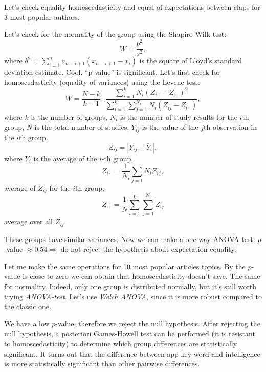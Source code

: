 \documentclass[12pt]{report}
\begin{document}
Let's check equality homoscedasticity and equal of expectations between claps for 3  most popular authors.

Let's check for the normality of the group using the Shapiro-Wilk test:
\[
W =\dfrac{b^2}{s^2},
\]
where $\displaystyle b^2 = \sum\limits_{i=1}^n a_{n-i+1}\left(x_{n-i+1} - x_i\right)$ is the square of Lloyd's standard deviation estimate. Cool. ``p-value'' is significant. Let's first check for homoscedasticity (equality of variances) using the Levene test:
\[
W =\dfrac{N-k}{k-1}\cdot \dfrac{\sum\limits_{i=1}^k N_i\left(Z_{i\cdot} - Z_{\cdot\cdot}\right)^2}{\sum\limits_{i=1}^k\sum\limits_{j=1}^{N_i}N_i\left(Z_{ij} - Z_{i\cdot}\right)},
\]
where $k$ is the number of groups, $N_i$ is the number of study results for the $i$th group, $N$ is the total number of studies, $Y_{ij}$ is the value of the $j$th observation in the $i$th group.
\[
    Z_{ij} = \left|Y_{ij} - \overline{Y}_i\right|,
\]
where $\overline{Y}_i$ is the average of the $i$-th group,
\[
Z_{i\cdot} = \dfrac{1}{N_i}\sum\limits_{j=1}{N_i} Z_{ij},
\]
average of $Z_{ij}$ for the $i$th group,
\[
Z_{\cdot\cdot} = \dfrac{1}{N}\sum\limits_{i=1}^k\sum\limits_{j=1}^{N_i}Z_{ij}
\]
average over all $Z_{ij}$.
\par 
These groups have similar variances. Now we can make a one-way ANOVA test: $p$-value $\approx 0.54 \Rightarrow $ do not reject the hypothesis about expectation equality.

\par 
Let me make the same operations for 10 most popular articles topics. By the $p$-value is close to zero we can obtain that homoscedasticity doesn't save. The same for normaliry. Indeed, only one group is distributed normally, but it's still worth trying \emph{ANOVA-test}.  Let's use \emph{Welch ANOVA}, since it is more robust compared to the classic one. 
\par
We have a low $p$-value, therefore we reject the null hypothesis. After rejecting the null hypothesis, a posteriori Games-Howell test can be performed (it is resistant to homoscedasticity) to determine which group differences are statistically significant. It turns out that the difference between app key word and intelligence is more statistically significant than other pairwise differences.
\end{document}
